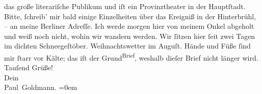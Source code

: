 \begin{ledgroupsized}[t]{13cm}
               das große literariſche Publikum und iſt ein Provinztheater in der \strikeout{\textcolor{gray}{H}}{ }Hauptſtadt.\pend
           \pstart
           Bitte, ſchreib’ mir bald {\pb}einige Einzelheiten über
               das Ereigniß in der Hinterbrühl, – an meine Berliner Adreſſe. Ich werde morgen{ }hier von meinem Onkel abgeholt und weiß noch
               nicht, wohin wir wandern werden. Wir ſitzen hier ſeit zwei Tagen im dichten Schneegeſtöber.
               Weihnachtswetter im Auguſt. Hände und Füße ſind mir ſtarr vor Kälte; das iſt der \introOben{}Grund\introOben{}{ }\substVorne{}\textsuperscript{Brief}\substDazwischen{}\substHinten{}, weshalb  dieſer Brief nicht länger
               wird.\pend
           \pstart
           {\pb}Tauſend Grüße! {\\[\baselineskip]}Dein {\\[\baselineskip]}\spacefill\mbox{Paul Goldmann.}\pend
           \leftskip=0em{}
         
         \endnumbering{}\end{ledgroupsized}  \newcommand{\dateiname}{L03219}\newcommand{\titel}{Paul Goldmann an Arthur Schnitzler, 12. 8. [1902]}\newcommand{\editorInnen}{Martin Anton Müller und Laura Untner}
      
